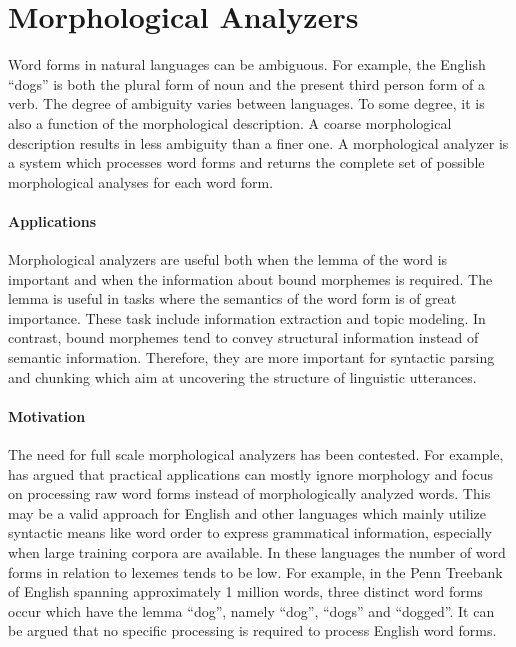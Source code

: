 \section{Morphological Analyzers}
Word forms in natural languages can be ambiguous. For example, the
English ``dogs'' is both the plural form of noun and the present third
person form of a verb. The degree of ambiguity varies between
languages. To some degree, it is also a function of the morphological
description. A coarse morphological description results in less
ambiguity than a finer one. A morphological analyzer is a system which
processes word forms and returns the complete set of possible
morphological analyses for each word form.

\paragraph{Applications} Morphological analyzers are useful both when
the lemma of the word is important and when the information about
bound morphemes is required. The lemma is useful in tasks where the
semantics of the word form is of great importance. These task include
information extraction and topic modeling. In contrast, bound
morphemes tend to convey structural information instead of semantic
information. Therefore, they are more important for syntactic parsing and
chunking which aim at uncovering the structure of linguistic
utterances.

\paragraph{Motivation} The need for full scale morphological analyzers
has been contested. For example, \cite{Church2005} has argued that
practical applications can mostly ignore morphology and focus on
processing raw word forms instead of morphologically analyzed
words. This may be a valid approach for English and other languages
which mainly utilize syntactic means like word order to express
grammatical information, especially when large training corpora are
available. In these languages the number of word forms in relation to
lexemes tends to be low. For example, in the Penn Treebank of English
\cite{Marcus1993} spanning approximately 1 million words, three
distinct word forms occur which have the lemma ``dog'', namely
``dog'', ``dogs'' and ``dogged''. It can be argued that no specific
processing is required to process English word forms.

